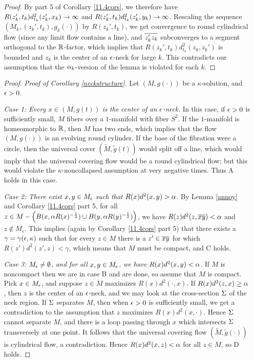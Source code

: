 \begin{proof}
By part 5 of Corollary \ref{11.4cors}, we therefore have
$R(z_k',t_k)d_{t_k}^2(z_k',x_k)\rightarrow\infty$ and
$R(z_k',t_k)d_{t_k}^2(z_k',y_k)\rightarrow\infty$.  Rescaling the sequence
$(M_k,(z_k',t_k),g_k(\cdot))$ by
$R(z_k',t_k)$, we get convergence to round cylindrical flow
(since any limit flow contains a line), and $\overline{z_k'z_k}$
subconverges to a segment orthogonal to the ${\mathbb R}$-factor, which
implies that $R(z_k',t_k)d_{t_k}^2(z_k,z_k')$ is bounded
and $z_k$ is the center of an $\epsilon$-neck for large $k$.  This contradicts
our assumption that the $\alpha_k$-version of the lemma is
violated for each $k$.
\end{proof}
\begin{proof}

\bigskip
\noindent
{\em Proof of Corollary \ref{neckstructure}.}
Let $(M,g(\cdot))$
be a $\kappa$-solution, and $\epsilon>0$.

\medskip
{\em Case 1: Every $x\in (M,g(t))$
is the center of an $\epsilon$-neck.}  In this case, if $\epsilon>0$ is sufficiently
small, $M$ fibers over a
$1$-manifold with fiber $S^2$.  If the
$1$-manifold is homeomorphic to ${\mathbb R}$, then
$M$ has two ends, which implies that the flow
$(M,g(\cdot))$ is an evolving round cylinder.  If the
base of the fibration were a circle, then the universal
cover $(\tilde M,\tilde g(t))$ would split off
a line, which would imply that the universal covering
flow would be a round cylindrical flow; but this
would violate the $\kappa$-noncollapsed assumption
at very negative times.  Thus A holds in this
case.


{\em Case 2: There exist $x,y\in M_\epsilon$ such that
$R(x)d^2(x,y)>\alpha$.}  By Lemma \ref{annoy} and Corollary \ref{11.4cors}
part 5, for all $z \in M - \left( B(x,\alpha R(x)^{-\frac{1}{2}})\cup
B(y,\alpha R(y)^{-\frac{1}{2}}) \right)
$, we have $R(z)d^2(z,\overline{xy})<\alpha$ and $z \notin M_\epsilon$.
This implies (again by
Corollary \ref{11.4cors} part 5) that there exists a
$\gamma=\gamma(\epsilon,\kappa)$ such that for every $z\in M$
there is a $z'\in\overline{xy}$ for which  $R(z')d^2(z',z)<\gamma$,
which means that $M$ must be compact, and C holds.

{\em Case 3: $M_\epsilon\neq \emptyset$, and for all $x,y\in M_\epsilon$,
we have $R(x)d^2(x,y)<\alpha$.}
If $M$ is noncompact then
we are in case B and are done, so assume that $M$ is compact.
Pick $x\in M_\epsilon$, and suppose  $z\in M$ maximizes
$R(x)d^2(\cdot,x)$.
If $R(x)d^2(z,x)\geq\alpha$,  then $z$ is the center of an $\epsilon$-neck, and we
may look at the cross-section $\Sigma$ of the neck region.
If $\Sigma$ separates $M$, then when $\epsilon>0$ is sufficiently
small, we  get a contradiction to the assumption
that $z$ maximizes $R(x)d^2(x,\cdot)$.  Hence
$\Sigma$ cannot separate $M$, and there is a loop
passing through $x$ which intersects $\Sigma$ transversely
at one point.  It follows that the universal covering flow
$(\tilde M,\tilde g(\cdot))$ is cylindrical flow, a contradiction.
Hence $R(x)d^2(x,z)<\alpha$ for all $z\in M$, so D holds.
\end{proof}



